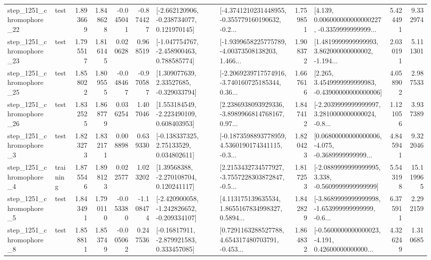 \begin{tabular}{llrrrrllrlrr}
 step\_1251\_chromophore\_22 &      test &      1.893669 &    1.848628 &     -0.045041 & -0.874427 &   [-2.662120906, -0.238734077, 0.121970145] &  [-4.3741210231448955, -0.355779160190632, -0.2... &       1.759851 &  [4.139, 0.006000000000000227, -0.3359999999999... &            5.424491 &          9.332974 \\
 step\_1251\_chromophore\_23 &      test &      1.795517 &    1.816145 &      0.020628 &  0.968519 &   [-1.047754767, -2.458900463, 0.788585774] &  [-1.9399658225775789, -4.00373508138203, 1.466... &       1.908372 &  [1.4819999999999993, 3.862000000000002, -1.194... &            2.030191 &          5.111301 \\
 step\_1251\_chromophore\_25 &      test &      1.858022 &    1.809555 &     -0.048467 & -0.970587 &     [1.309077639, 2.33527685, -0.329033794] &  [-2.2069239717574916, -3.740160725185344, 0.36... &       1.667616 &  [2.265, 3.4549999999999983, -0.43900000000000006] &            4.058902 &          2.987533 \\
 step\_1251\_chromophore\_26 &      test &      1.832525 &    1.868779 &      0.036254 &  1.407046 &    [1.553184549, -2.223490109, 0.608403953] &  [2.2386938093929336, -3.8989966814768167, 0.97... &       1.847412 &  [-2.2039999999999997, 3.2810000000000024, -0.8... &            1.121056 &          3.937389 \\
  step\_1251\_chromophore\_3 &      test &      1.823273 &    1.832171 &      0.008898 &  0.639330 &     [-0.138337325, 2.75133529, 0.034802611] &  [-0.1873598893778959, 4.5360190174341115, -0.3... &       1.820423 &  [0.06800000000000006, -4.075, -0.3689999999999... &            4.845941 &          9.322046 \\
  step\_1251\_chromophore\_4 &  training &      1.875546 &    1.898123 &      0.022577 &  1.023202 &     [1.39568388, -2.270108704, 0.120241117] &  [2.2153432734577927, -3.7557228303872847, -0.5... &       1.817253 &  [-2.0889999999999995, 3.338, -0.5609999999999999] &            5.543198 &         15.119965 \\
  step\_1251\_chromophore\_5 &      test &      1.843491 &    1.790110 &     -0.053380 & -1.108474 &  [-2.420900058, -1.242826652, -0.209334107] &  [4.113175139635534, 1.8655167834998327, 0.5894... &       1.842829 &  [-3.8689999999999998, -1.653999999999999, -0.6... &            6.375911 &          2.292159 \\
  step\_1251\_chromophore\_8 &      test &      1.858811 &    1.853749 &     -0.005062 &  0.247536 &    [-0.16817911, -2.879921583, 0.333457085] &  [0.7291163288527788, 4.654317480703791, -0.453... &       1.864832 &  [-0.5600000000000023, -4.191, 0.42600000000000... &            4.326249 &          1.310685 \\

\end{tabular}
